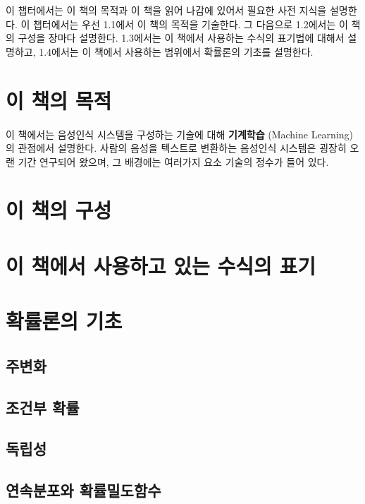 \documentclass[../main.tex]{subfiles}
\begin{document}
이 챕터에서는 이 책의 목적과 이 책을 읽어 나감에 있어서 필요한 사전 지식을 설명한다. 
이 챕터에서는 우선 1.1에서 이 책의 목적을 기술한다. 
그 다음으로 1.2에서는 이 책의 구성을 장마다 설명한다. 
1.3에서는 이 책에서 사용하는 수식의 표기법에 대해서 설명하고, 1.4에서는 이 책에서 사용하는 범위에서 확률론의 기초를 설명한다. 

\section{이 책의 목적}
이 책에서는 음성인식 시스템을 구성하는 기술에 대해 \textbf{기계학습} (Machine Learning)의 관점에서 설명한다. 
사람의 음성을 텍스트로 변환하는 음성인식 시스템은 굉장히 오랜 기간 연구되어 왔으며, 그 배경에는 여러가지 요소 기술의 정수가 들어 있다. 

\section{이 책의 구성}
\section{이 책에서 사용하고 있는 수식의 표기}
\section{확률론의 기초}
\subsection{주변화}
\subsection{조건부 확률}
\subsection{독립성}
\subsection{연속분포와 확률밀도함수}
\end{document}
